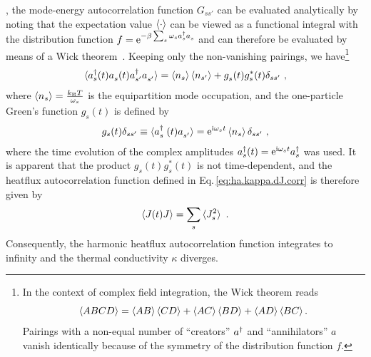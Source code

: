 , the mode-energy autocorrelation function $G_{ss'}$ can be evaluated analytically by noting that the expectation value $\braket{\cdot}$ can be viewed as a functional integral with the distribution function $f = {\rm e}^{-\beta \sum_s \omega_s \D a_{s} \fD a_{s}}$ and can therefore be evaluated by means of a Wick theorem~\cite{Isaeva2019}.
Keeping only the non-vanishing pairings, we have\footnote{In the context of complex field integration, the Wick theorem reads~\cite{Negele2018} $$\braket{ABCD} = \braket{AB}\braket{CD} + \braket{AC}\braket{BD} + \braket{AD}\braket{BC}.$$ Pairings with a non-equal number of ``creators'' ${a}^\dagger$ and ``annihilators'' $a$ vanish identically because of the symmetry of the distribution function $f$.}
\begin{align}
	\braket{\D a_s (t) \fD{a}_s (t) \D a_{s'} \fD a_{s'}}
		= \braket{n_s} \braket{n_{s'}} + \fD g_s (t) g^\ast_{s} (t) \delta_{ss'}~,
	\label{eq:ha.kappa.wick}
\end{align}
where $\braket{n_s} = \frac{k_{\rm B} T}{\omega_s}$
is the equipartition mode occupation, and the one-particle Green's function $g_s (t)$ is defined by
\begin{align}
	g_s (t) \delta_{ss'}
		\equiv \braket{\D{a}_{\fP s} (t) \fD{a}_{s'}} 
		= {\rm e}^{\im \omega_s t} \braket{n_s} \delta_{ss'}~,
\end{align}
where the time evolution of the complex amplitudes $a^{\dagger}_s (t) = {\rm e}^{{\rm i} \omega_s t} {a}^\dagger_s$ was used.
It is apparent that the product $g_s(t) g^\ast_s(t)$ is not time-dependent, and the heatflux autocorrelation function defined in Eq.\,\eqref{eq:ha.kappa.dJ.corr} is therefore given by
\begin{align}
	\braket{J (t) J} = \sum_s \braket{J_s^2}~.
	\label{eq:ha.kappa.JJ}
\end{align}
Consequently, the harmonic heatflux autocorrelation function integrates to infinity and the thermal conductivity $\kappa$ diverges.

